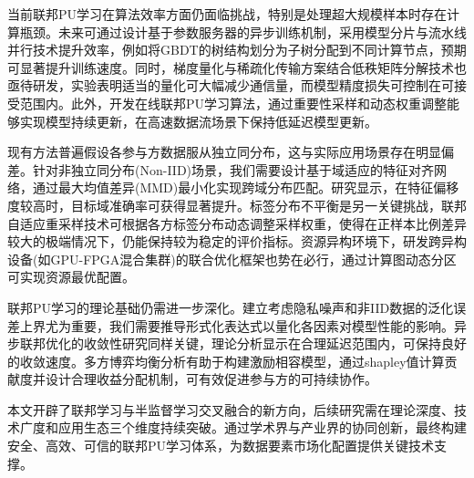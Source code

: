 当前联邦PU学习在算法效率方面仍面临挑战，特别是处理超大规模样本时存在计算瓶颈。未来可通过设计基于参数服务器的异步训练机制，采用模型分片与流水线并行技术提升效率，例如将GBDT的树结构划分为子树分配到不同计算节点，预期可显著提升训练速度。同时，梯度量化与稀疏化传输方案结合低秩矩阵分解技术也亟待研发，实验表明适当的量化可大幅减少通信量，而模型精度损失可控制在可接受范围内。此外，开发在线联邦PU学习算法，通过重要性采样和动态权重调整能够实现模型持续更新，在高速数据流场景下保持低延迟模型更新。

现有方法普遍假设各参与方数据服从独立同分布，这与实际应用场景存在明显偏差。针对非独立同分布(Non-IID)场景，我们需要设计基于域适应的特征对齐网络，通过最大均值差异(MMD)最小化实现跨域分布匹配。研究显示，在特征偏移度较高时，目标域准确率可获得显著提升。标签分布不平衡是另一关键挑战，联邦自适应重采样技术可根据各方标签分布动态调整采样权重，使得在正样本比例差异较大的极端情况下，仍能保持较为稳定的评价指标。资源异构环境下，研发跨异构设备(如GPU-FPGA混合集群)的联合优化框架也势在必行，通过计算图动态分区可实现资源最优配置。

联邦PU学习的理论基础仍需进一步深化。建立考虑隐私噪声和非IID数据的泛化误差上界尤为重要，我们需要推导形式化表达式以量化各因素对模型性能的影响。异步联邦优化的收敛性研究同样关键，理论分析显示在合理延迟范围内，可保持良好的收敛速度。多方博弈均衡分析有助于构建激励相容模型，通过shapley值计算贡献度并设计合理收益分配机制，可有效促进参与方的可持续协作。

本文开辟了联邦学习与半监督学习交叉融合的新方向，后续研究需在理论深度、技术广度和应用生态三个维度持续突破。通过学术界与产业界的协同创新，最终构建安全、高效、可信的联邦PU学习体系，为数据要素市场化配置提供关键技术支撑。
